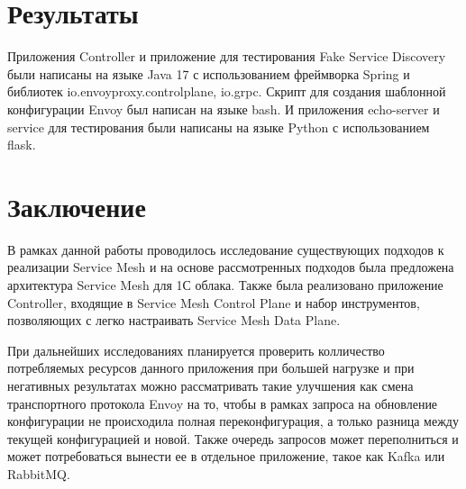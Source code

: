 
\section{Результаты}

Приложения Controller и приложение для тестирования Fake Service Discovery были написаны на языке Java 17 с использованием фреймворка Spring и  библиотек io.envoyproxy.controlplane, io.grpc. Скрипт для создания шаблонной конфигурации Envoy был написан на языке bash. И приложения echo-server и service для тестирования были написаны на языке Python с использованием flask.

\section{Заключение}

В рамках данной работы проводилось исследование существующих подходов к реализации Service Mesh и на основе рассмотренных подходов была предложена архитектура Service Mesh для 1С облака. Также была реализовано приложение Controller, входящие в Service Mesh Control Plane и набор инструментов, позволяющих с легко настраивать Service Mesh Data Plane.

При дальнейших исследованиях планируется проверить колличество потребляемых ресурсов данного приложения при большей нагрузке и при негативных результатах можно рассматривать такие улучшения как смена транспортного протокола Envoy на то, чтобы в рамках запроса на обновление конфигурации не происходила полная переконфигурация, а только разница между текущей конфигурацией и новой. Также очередь запросов может переполниться и может потребоваться вынести ее в отдельное приложение, такое как Kafka или RabbitMQ.



